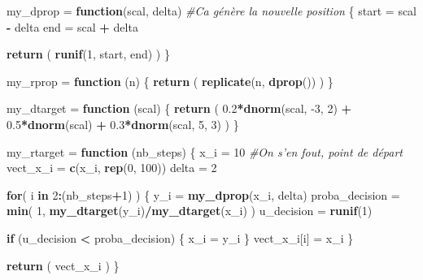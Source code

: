 \documentclass[]{article}
\newenvironment{Shaded}{\begin{snugshade}}{\end{snugshade}}
\newcommand{\CommentTok}[1]{\textcolor[rgb]{0.56,0.35,0.01}{\textit{#1}}}
\newcommand{\ControlFlowTok}[1]{\textcolor[rgb]{0.13,0.29,0.53}{\textbf{#1}}}
\newcommand{\DecValTok}[1]{\textcolor[rgb]{0.00,0.00,0.81}{#1}}
\newcommand{\FloatTok}[1]{\textcolor[rgb]{0.00,0.00,0.81}{#1}}
\newcommand{\KeywordTok}[1]{\textcolor[rgb]{0.13,0.29,0.53}{\textbf{#1}}}
\newcommand{\NormalTok}[1]{#1}
\newcommand{\OperatorTok}[1]{\textcolor[rgb]{0.81,0.36,0.00}{\textbf{#1}}}
\newcommand{\StringTok}[1]{\textcolor[rgb]{0.31,0.60,0.02}{#1}}
\begin{document}
\begin{Shaded}
\begin{Highlighting}[]
\NormalTok{my_dprop =}\StringTok{ }\ControlFlowTok{function}\NormalTok{(scal, delta) }\CommentTok{#Ca génère la nouvelle position}
\NormalTok{\{}
\NormalTok{  start =}\StringTok{ }\NormalTok{scal }\OperatorTok{-}\StringTok{ }\NormalTok{delta}
\NormalTok{  end =}\StringTok{ }\NormalTok{scal }\OperatorTok{+}\StringTok{ }\NormalTok{delta}
  
  \KeywordTok{return}\NormalTok{ ( }\KeywordTok{runif}\NormalTok{(}\DecValTok{1}\NormalTok{, start, end) )}
\NormalTok{\}}

\NormalTok{my_rprop =}\StringTok{ }\ControlFlowTok{function}\NormalTok{ (n) \{ }\KeywordTok{return}\NormalTok{ ( }\KeywordTok{replicate}\NormalTok{(n, }\KeywordTok{dprop}\NormalTok{()) ) \}}

\NormalTok{my_dtarget =}\StringTok{ }\ControlFlowTok{function}\NormalTok{ (scal)}
\NormalTok{\{}
  \KeywordTok{return}\NormalTok{ ( }\FloatTok{0.2}\OperatorTok{*}\KeywordTok{dnorm}\NormalTok{(scal, }\DecValTok{-3}\NormalTok{, }\DecValTok{2}\NormalTok{) }\OperatorTok{+}\StringTok{ }\FloatTok{0.5}\OperatorTok{*}\KeywordTok{dnorm}\NormalTok{(scal) }\OperatorTok{+}\StringTok{ }\FloatTok{0.3}\OperatorTok{*}\KeywordTok{dnorm}\NormalTok{(scal, }\DecValTok{5}\NormalTok{, }\DecValTok{3}\NormalTok{) )}
\NormalTok{\}}

\NormalTok{my_rtarget =}\StringTok{ }\ControlFlowTok{function}\NormalTok{ (nb_steps)}
\NormalTok{\{}
\NormalTok{  x_i =}\StringTok{ }\DecValTok{10} \CommentTok{#On s'en fout, point de départ}
\NormalTok{  vect_x_i =}\StringTok{ }\KeywordTok{c}\NormalTok{(x_i, }\KeywordTok{rep}\NormalTok{(}\DecValTok{0}\NormalTok{, }\DecValTok{100}\NormalTok{))}
\NormalTok{  delta =}\StringTok{ }\DecValTok{2}
  
  \ControlFlowTok{for}\NormalTok{( i }\ControlFlowTok{in} \DecValTok{2}\OperatorTok{:}\NormalTok{(nb_steps}\OperatorTok{+}\DecValTok{1}\NormalTok{) )}
\NormalTok{  \{}
\NormalTok{    y_i =}\StringTok{ }\KeywordTok{my_dprop}\NormalTok{(x_i, delta)}
\NormalTok{    proba_decision =}\StringTok{ }\KeywordTok{min}\NormalTok{( }\DecValTok{1}\NormalTok{, }\KeywordTok{my_dtarget}\NormalTok{(y_i)}\OperatorTok{/}\KeywordTok{my_dtarget}\NormalTok{(x_i) )}
\NormalTok{    u_decision =}\StringTok{ }\KeywordTok{runif}\NormalTok{(}\DecValTok{1}\NormalTok{)}
    
    \ControlFlowTok{if}\NormalTok{ (u_decision }\OperatorTok{<}\StringTok{ }\NormalTok{proba_decision) \{  x_i =}\StringTok{ }\NormalTok{y_i \}}
\NormalTok{    vect_x_i[i] =}\StringTok{ }\NormalTok{x_i}
\NormalTok{  \}}
  
  \KeywordTok{return}\NormalTok{ ( vect_x_i )}
\NormalTok{\}}
\end{Highlighting}
\end{Shaded}
\end{document}
